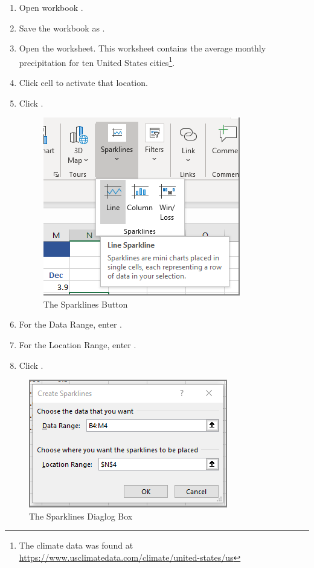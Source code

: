 \begin{enumbox}
	\begin{enumerate}
		\item Open workbook .
		\item Save the workbook as .
		\item Open the  worksheet. This worksheet contains the average monthly precipitation for ten United States cities\footnote{The climate data was found at \url{https://www.usclimatedata.com/climate/united-states/us}}.
		\item Click cell  to activate that location.
		\item Click .
	
		\begin{figure}[H]
			\centering
			\includegraphics[width=\maxwidth{.65\linewidth}]{gfx/ch08_fig01}
			\caption{The Sparklines Button}
			\label{08:fig01}
		\end{figure}
			
		\item For the Data Range, enter .
		\item For the Location Range, enter .
		\item Click .
	\end{enumerate}
\end{enumbox}

\begin{figure}[H]
	\centering
	\includegraphics[width=\maxwidth{.65\linewidth}]{gfx/ch08_fig02}
	\caption{The Sparklines Diaglog Box}
	\label{08:fig02}
\end{figure}

